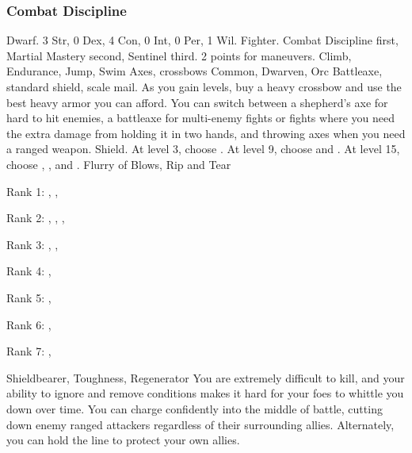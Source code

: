         \subsubsection{Combat Discipline}
             Dwarf.
             3 Str, 0 Dex, 4 Con, 0 Int, 0 Per, 1 Wil.
             Fighter.
             Combat Discipline first, Martial Mastery second, Sentinel third.
             2 points for maneuvers.
             Climb, Endurance, Jump, Swim
             Axes, crossbows
             Common, Dwarven, Orc
             Battleaxe, standard shield, scale mail. As you gain levels, buy a heavy crossbow and use the best heavy armor you can afford.
            You can switch between a shepherd's axe for hard to hit enemies, a battleaxe for multi-enemy fights or fights where you need the extra damage from holding it in two hands, and throwing axes when you need a ranged weapon.
             Shield.
                At level 3, choose .
                At level 9, choose  and .
                At level 15, choose , , and .
             Flurry of Blows, Rip and Tear
            \begin{raggeditemize}
                \item Rank 1: , , 
                \item Rank 2: , , , 
                \item Rank 3: , , 
                \item Rank 4: , 
                \item Rank 5: , 
                \item Rank 6: , 
                \item Rank 7: , 
            \end{raggeditemize}
             Shieldbearer, Toughness, Regenerator
             You are extremely difficult to kill, and your ability to ignore and remove conditions makes it hard for your foes to whittle you down over time.
            You can charge confidently into the middle of battle, cutting down enemy ranged attackers regardless of their surrounding allies.
            Alternately, you can hold the line to protect your own allies.

